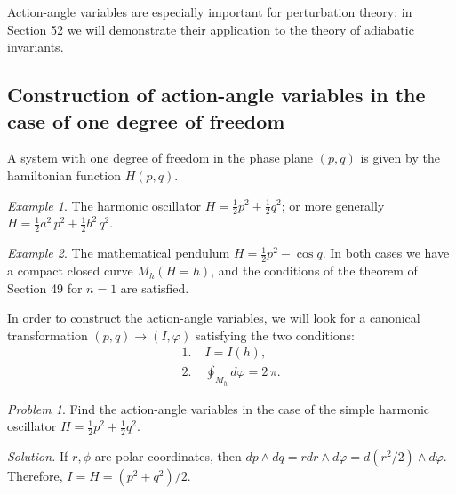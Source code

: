 \documentclass[leqno]{book}
\numberwithin{equation}{section}
\theoremstyle{plain}
\theoremstyle{definition}
\theoremstyle{remark}
\theoremstyle{smallcap}
\newtheorem{ex}{Example}
\newtheorem*{prob*}{Problem}
\numberwithin{prob}{section}
\newcommand{\solution}[1]{\textit{Solution.} #1}
\begin{document}
Action-angle variables are especially important for perturbation theory;
in Section 52 we will demonstrate their application to the theory
of adiabatic invariants.


\subsection{Construction of action-angle variables in the
  case of one degree of freedom}

A system with one degree of freedom in the phase plane $(p,q)$
is given by the hamiltonian function $H(p, q)$.

\begin{ex}
  The harmonic oscillator $H = \frac{1}{2} p^2 + \frac{1}{2} q^2$;
  or more generally $H = \frac{1}{2} a^2 \, p^2 + \frac{1}{2} b^2 \, q^2$.

\end{ex}

\begin{ex}
  The mathematical pendulum $H = \frac{1}{2} p^2 - \cos q$.
  In both cases we have a compact closed curve
  $M_h(H = h)$, and the conditions of the theorem of Section 49
  for $n = 1$ are satisfied.
\end{ex}

In order to construct the action-angle variables,
we will look for a canonical transformation
$(p, q) \rightarrow (I, \varphi)$
satisfying the two conditions:
\begin{equation}
  \begin{aligned}
    1. \; & I = I(h), \\
    2. \; & \oint_{M_h} d\varphi = 2 \, \pi.
  \end{aligned}
  \label{eq:CT_Iphi_condition}
\end{equation}

\begin{prob*}
  Find the action-angle variables in the case of the simple harmonic oscillator
  $H = \frac{1}{2} p^2 + \frac{1}{2} q^2$.

  \solution{
    If $r, \phi$ are polar coordinates,
    then $dp \wedge dq = r dr \wedge d\varphi = d(r^2/2) \wedge d\varphi$.
    Therefore, $I = H = (p^2 + q^2)/2$.
  }
\end{prob*}
\end{document}
